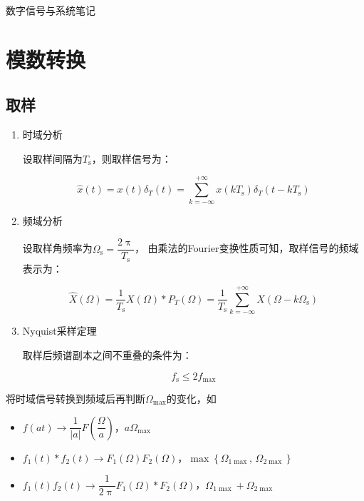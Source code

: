 \documentclass[UTF8,fontset=fandol,zihao=5]{ctexart}
\begin{document}
\begin{center}
  {\heiti\headingfont{}\color{main} 数字信号与系统笔记}
\end{center}

\section{模数转换}

\subsection{取样}

\begin{enumerate}
  \item 时域分析
  
  设取样间隔为$T_{\mathrm{s}}$，则取样信号为：

  \[
  \hat{x}(t)=x(t)\delta_T(t)=\sum_{k=-\infty}^{+\infty} x(kT_{\mathrm{s}})\delta_T(t-kT_{\mathrm{s}})
  \]

  \item 频域分析
  
  设取样角频率为$\varOmega_{\mathrm{s}}=\dfrac{2\uppi}{T_{\mathrm{s}}}$，
  由乘法的Fourier变换性质可知，取样信号的频域表示为：

  \[
  \hat{X}(\varOmega)=\dfrac{1}{T_{\mathrm{s}}}X(\varOmega)\ast P_T(\varOmega)=\dfrac{1}{T_{\mathrm{s}}}\sum_{k=-\infty}^{+\infty} X(\varOmega-k\varOmega_{\mathrm{s}})
  \]

  \item Nyquist采样定理
  
  取样后频谱副本之间不重叠的条件为：

  \[
  f_{\mathrm{s}} \leq 2f_{\max}
  \]

\end{enumerate}

\begin{methodbox}[【题型】求运算后信号的取样频率]
  
  将时域信号转换到频域后再判断$\varOmega_{\max}$的变化，如
  
  \begin{itemize}
    \item $f(at) \longrightarrow \dfrac{1}{|a|}F(\dfrac{\varOmega}{a})$，$a\varOmega_{\max}$
    \item $f_1(t) \ast f_2(t) \longrightarrow F_1(\varOmega)F_2(\varOmega)$，$\max\left\{\varOmega_{1\max},\,\varOmega_{2\max}\right\}$
    \item $f_1(t)f_2(t) \longrightarrow \dfrac{1}{2\uppi} F_1(\varOmega) \ast F_2(\varOmega)$，$\varOmega_{1\max} + \varOmega_{2\max}$
  \end{itemize}
  
\end{methodbox}
\end{document}
